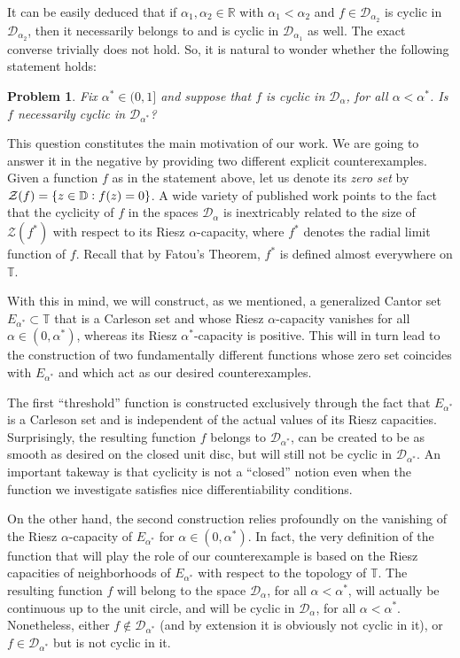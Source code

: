\documentclass[12pt]{amsart}
\newtheorem*{problem*}{Problem}
\theoremstyle{definition}\newtheorem{remark}[theorem]{Remark}
\theoremstyle{definition}\newtheorem{example}[theorem]{Example}
\theoremstyle{definition}\newtheorem{definition}{Definition}
\numberwithin{equation}{section}
\newcommand\cD{{\mathcal D}}
\newcommand\RR{{\mathbb R}}
\newcommand\DD{{\mathbb D}}
\newcommand\TT{{\mathbb T}}
\begin{document}
It can be easily deduced that if $\alpha_1,\alpha_2\in\RR$ with $\alpha_1<\alpha_2$ and $f\in\mathcal{D}_{\alpha_2}$ is cyclic in $\mathcal{D}_{\alpha_2}$, then it necessarily belongs to and is cyclic in $\mathcal{D}_{\alpha_1}$ as well. The exact converse trivially does not hold. So, it is natural to wonder whether the following statement holds:
\begin{problem*} \label{Problem}
Fix $\alpha^*\in (0,1]$ and suppose that $f$ is cyclic in $\mathcal{D}_\alpha$, for all $\alpha<\alpha^*$. Is $f$ necessarily cyclic in $\mathcal{D}_{\alpha^*}$?    
\end{problem*}

This question constitutes the main motivation of our work. We are going to answer it in the negative by providing two different explicit counterexamples. Given a function $f$ as in the statement above, let us denote its \textit{zero set} by $\mathcal{Z}(f)=\{z\in\DD\vcentcolon f(z)=0\}$. A wide variety of published work points to the fact that the cyclicity of $f$ in the spaces $\mathcal{D}_\alpha$ is inextricably related to the size of $\mathcal{Z}(f^*)$ with respect to its Riesz $\alpha$-capacity, where $f^*$ denotes the radial limit function of $f$. Recall that by Fatou's Theorem, $f^*$ is defined almost everywhere on $\TT$.  

With this in mind, we will construct, as we mentioned, a generalized Cantor set $E_{\alpha^*}\subset \TT$ that is a Carleson set and whose Riesz $\alpha$-capacity vanishes for all $\alpha\in (0,\alpha^*)$, whereas its Riesz $\alpha^*$-capacity is positive. This will in turn lead to the construction of two fundamentally different functions whose zero set coincides with $E_{\alpha^*}$ and which act as our desired counterexamples.

The first ``threshold'' function is constructed exclusively through the fact that $E_{\alpha^*}$ is a Carleson set and is independent of the actual values of its Riesz capacities. Surprisingly, the resulting function $f$ belongs to $\cD_{\alpha^*}$, can be created to be as smooth as desired on the closed unit disc, but will still not be cyclic in $\cD_{\alpha^*}$. An important takeway is that cyclicity is not a ``closed'' notion even when the function we investigate satisfies nice differentiability conditions.

On the other hand, the second construction relies profoundly on the vanishing of the Riesz $\alpha$-capacity of $E_{\alpha^*}$ for $\alpha\in (0,\alpha^*)$. In fact, the very definition of the function that will play the role of our counterexample is based on the Riesz capacities of neighborhoods of $E_{\alpha^*}$ with respect to the topology of $\TT$. The resulting function $f$ will belong to the space $\cD_{\alpha}$, for all $\alpha<\alpha^*$, will actually be continuous up to the unit circle, and will be cyclic in $\cD_{\alpha}$, for all $\alpha<\alpha^*$. Nonetheless, either $f\notin\cD_{\alpha^*}$ (and by extension it is obviously not cyclic in it), or $f\in\cD_{\alpha^*}$ but is not cyclic in it. 
\end{document}
